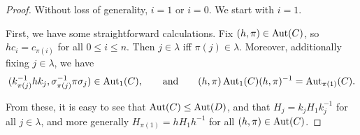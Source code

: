 \documentclass[a4paper,10pt
,draft
]{article}%
\renewcommand{\1}{\eta}%
\begin{document}
\begin{proof}
      Without loss of generality, $i = 1$ or $i = 0$.
      We start with $i=1$.
      
      First, we have some straightforward calculations. Fix $(h,\pi) \in \operatorname{Aut}(C)$, so $h c_i = c_{\pi(i)}$ for all $0 \leq i \leq n$.
      Then $j \in \lambda$ iff $\pi(j) \in \lambda$.
      Moreover, additionally fixing $j \in \lambda$, we have
      \begin{equation}
            \label{STAB_CONJ_EQ}
            (k_{\pi(j)}^{-1} h k_j, \sigma_{\pi(j)}^{-1} \pi \sigma_j) \in \operatorname{Aut}_1(C),
            \qquad
            \textrm{and}
            \qquad
            (h,\pi) \operatorname{Aut}_1(C) (h,\pi)^{-1} = \operatorname{Aut}_{\pi(1)}(C).
      \end{equation}

      From these, it is easy to see that $\operatorname{Aut}(C) \leq \operatorname{Aut}(D)$,
      and that $H_j = k_j H_1 k_j^{-1}$ for all $j \in \lambda$,
      and more generally $H_{\pi(1)} = h H_1 h^{-1}$ for all $(h,\pi) \in \operatorname{Aut}(C)$.


\end{proof}
\end{document}
